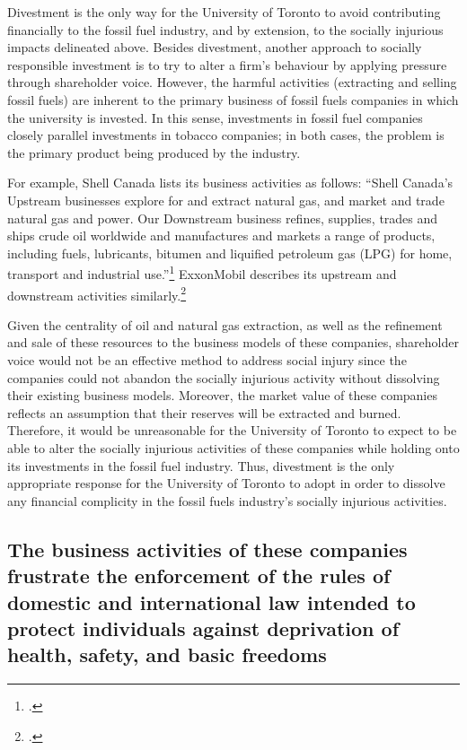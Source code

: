 Divestment is the only way for the University of Toronto to avoid contributing financially to the fossil fuel industry, and by extension, to the socially injurious impacts delineated above.
Besides divestment, another approach to socially responsible investment is to try to alter a firm’s behaviour by applying pressure through shareholder voice. 
However, the harmful activities (extracting and selling fossil fuels) are inherent to the primary business of fossil fuels companies in which the university is invested.  
In this sense, investments in fossil fuel companies closely parallel investments in tobacco companies; in both cases, the problem is the primary product being produced by the industry.



For example, Shell Canada lists its business activities as follows: ``Shell Canada's Upstream businesses explore for and extract natural gas, and market and trade natural gas and power. Our Downstream business refines, supplies, trades and ships crude oil worldwide and manufactures and markets a range of products, including fuels, lubricants, bitumen and liquified petroleum gas (LPG) for home, transport and industrial use.''\footcite[][]{ShellAtAGlance}
ExxonMobil describes its upstream and downstream activities similarly.\footcite[][]{ExxonWhatWeDo}



Given the centrality of oil and natural gas extraction, as well as the refinement and sale of these resources to the business models of these companies, shareholder voice would not be an effective method to address social injury since the companies could not abandon the socially injurious activity without dissolving their existing business models.  
Moreover, the market value of these companies reflects an assumption that their reserves will be extracted and burned.  
Therefore, it would be unreasonable for the University of Toronto to expect to be able to alter the socially injurious activities of these companies while holding onto its investments in the fossil fuel industry.  
Thus, divestment is the only appropriate response for the University of Toronto to adopt in order to dissolve any financial complicity in the fossil fuels industry’s socially injurious activities.  



	\subsection{The business activities of these companies frustrate the enforcement of the rules of domestic and international law intended to protect individuals against deprivation of health, safety, and basic freedoms}



